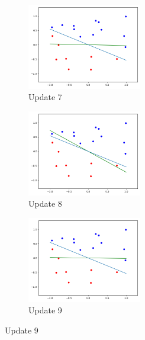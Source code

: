 \documentclass[12pt,letterpaper]{article}
\begin{document}
\begin{enumerate}[leftmargin=!,labelindent=5pt]
\begin{figure}[H]
        \begin{subfigure}{0.3\textwidth}
        \includegraphics[width=5cm]{images/b9.png} 
        \caption{Update 7}
        \label{fig:subim4}
        \end{subfigure}
        \begin{subfigure}{0.3\textwidth}
        \includegraphics[width=5cm]{images/b10.png}
        \caption{Update 8}
        \label{fig:subim5}
        \end{subfigure}
        \begin{subfigure}{0.3\textwidth}
        \includegraphics[width=5cm]{images/b11.png}
        \caption{Update 9}
        \label{fig:subim6}
        \end{subfigure}
        \end{figure}
        

\end{enumerate}
\end{document}
